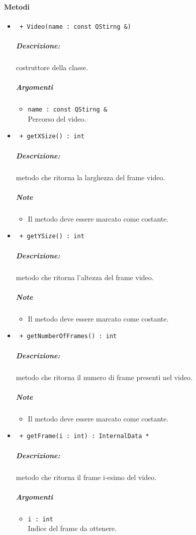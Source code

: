 \paragraph{Metodi\\}
	\begin{itemize}
		\item \color{blue}\verb! + Video(name : const QStirng &)!\\
			\color{black}
			\subparagraph{Descrizione:} costruttore della classe.
			\subparagraph{Argomenti}
				\begin{itemize}
					\item \color{RoyalPurple}\verb!name : const QStirng &!\\
					\color{black}Percorso del video.
				\end{itemize}
			
		\item \color{blue}\verb! + getXSize() : int !\\
		\color{black}
		\subparagraph{Descrizione:} metodo che ritorna la larghezza del frame video.
		\subparagraph{Note}
			\begin{itemize}
				\item Il metodo deve essere marcato come costante.
			\end{itemize}
		
		\item \color{blue}\verb! + getYSize() : int !\\
		\color{black}
		\subparagraph{Descrizione:} metodo che ritorna l'altezza del frame video.
		\subparagraph{Note}
			\begin{itemize}
				\item Il metodo deve essere marcato come costante.
			\end{itemize}
			
		\item \color{blue}\verb! + getNumberOfFrames() : int !\\
		\color{black}
		\subparagraph{Descrizione:} metodo che ritorna il numero di frame presenti nel video.
		\subparagraph{Note}
			\begin{itemize}
				\item Il metodo deve essere marcato come costante.
			\end{itemize}
			
		\item \color{blue}\verb! + getFrame(i : int) : InternalData * !\\
		\color{black}
		\subparagraph{Descrizione:} metodo che ritorna il frame i-esimo del video.
		\subparagraph{Argomenti}
				\begin{itemize}
					\item \color{RoyalPurple}\verb!i : int !\\
					\color{black}Indice del frame da ottenere.
				\end{itemize}
		

\end{itemize}
